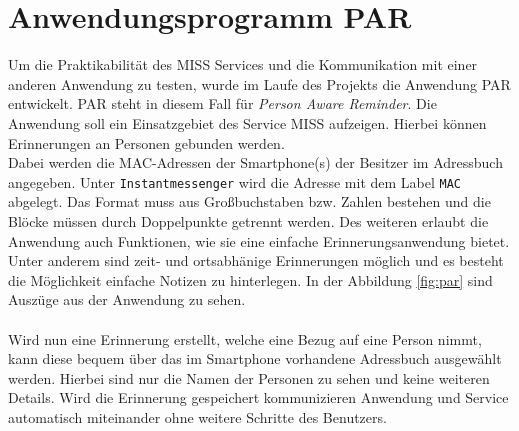 \documentclass[]{report}
\begin{document}
\section{Anwendungsprogramm PAR}\label{lab:par}
Um die Praktikabilität des MISS Services und die Kommunikation mit einer anderen Anwendung zu testen, wurde im Laufe des Projekts die Anwendung PAR entwickelt. PAR steht in diesem Fall für \textit{Person Aware Reminder}. Die Anwendung soll ein Einsatzgebiet des Service MISS aufzeigen. Hierbei können Erinnerungen an Personen gebunden werden. \\
Dabei werden die MAC-Adressen der Smartphone(s) der Besitzer im Adressbuch angegeben. Unter \texttt{Instantmessenger} wird die Adresse mit dem Label \texttt{MAC} abgelegt. Das Format muss aus Großbuchstaben bzw. Zahlen bestehen und die Blöcke müssen durch Doppelpunkte getrennt werden. Des weiteren erlaubt die Anwendung auch Funktionen, wie sie eine einfache Erinnerungsanwendung bietet. Unter anderem sind zeit- und ortsabhänige Erinnerungen möglich und es besteht die Möglichkeit einfache Notizen zu hinterlegen. In der Abbildung \ref{fig:par} sind Auszüge aus der Anwendung zu sehen. \\\\
Wird nun eine Erinnerung erstellt, welche eine Bezug auf eine Person nimmt, kann diese bequem über das im Smartphone vorhandene Adressbuch ausgewählt werden. Hierbei sind nur die Namen der Personen zu sehen und keine weiteren Details. Wird die Erinnerung gespeichert kommunizieren Anwendung und Service automatisch miteinander ohne weitere Schritte des Benutzers.   
\end{document}
